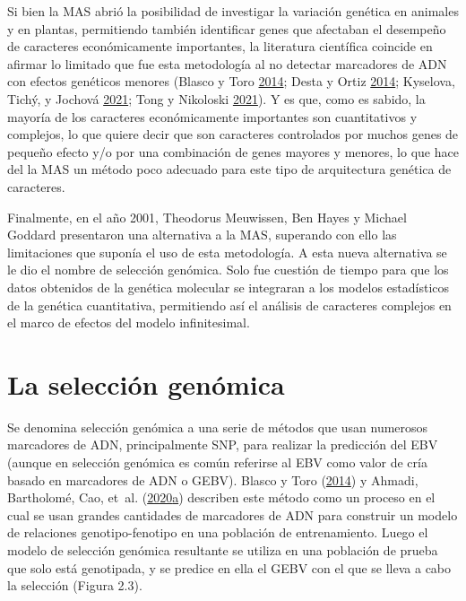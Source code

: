 \documentclass[11pt,spanish,a4paper,oneside,]{book} %
\begin{document}
\hspace*{1em}

Si bien la MAS abrió la posibilidad de investigar la variación genética en animales y en plantas, permitiendo también identificar genes que afectaban el desempeño de caracteres económicamente importantes, la literatura científica coincide en afirmar lo limitado que fue esta metodología al no detectar marcadores de ADN con efectos genéticos menores (Blasco y Toro \protect\hyperlink{ref-cite:3}{2014}; Desta y Ortiz \protect\hyperlink{ref-cite:10}{2014}; Kyselova, Tichý, y Jochová \protect\hyperlink{ref-cite:32}{2021}; Tong y Nikoloski \protect\hyperlink{ref-cite:7}{2021}). Y es que, como es sabido, la mayoría de los caracteres económicamente importantes son cuantitativos y complejos, lo que quiere decir que son caracteres controlados por muchos genes de pequeño efecto y/o por una combinación de genes mayores y menores, lo que hace del la MAS un método poco adecuado para este tipo de arquitectura genética de caracteres.

Finalmente, en el año 2001, Theodorus Meuwissen, Ben Hayes y Michael Goddard presentaron una alternativa a la MAS, superando con ello las limitaciones que suponía el uso de esta metodología. A esta nueva alternativa se le dio el nombre de selección genómica. Solo fue cuestión de tiempo para que los datos obtenidos de la genética molecular se integraran a los modelos estadísticos de la genética cuantitativa, permitiendo así el análisis de caracteres complejos en el marco de efectos del modelo infinitesimal.

\hypertarget{la-selecciuxf3n-genuxf3mica}{%
\section{La selección genómica}\label{la-selecciuxf3n-genuxf3mica}}

Se denomina selección genómica a una serie de métodos que usan numerosos marcadores de ADN, principalmente SNP, para realizar la predicción del EBV (aunque en selección genómica es común referirse al EBV como valor de cría basado en marcadores de ADN o GEBV). Blasco y Toro (\protect\hyperlink{ref-cite:3}{2014}) y Ahmadi, Bartholomé, Cao, et~al. (\protect\hyperlink{ref-cite:33}{2020}\protect\hyperlink{ref-cite:33}{a}) describen este método como un proceso en el cual se usan grandes cantidades de marcadores de ADN para construir un modelo de relaciones genotipo-fenotipo en una población de entrenamiento. Luego el modelo de selección genómica resultante se utiliza en una población de prueba que solo está genotipada, y se predice en ella el GEBV con el que se lleva a cabo la selección (Figura 2.3).
\end{document}
